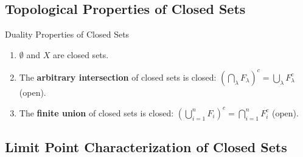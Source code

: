 \documentclass[11pt,a4paper]{article}
\begin{document}
\subsection{Topological Properties of Closed Sets}

\begin{formulabox}{Duality Properties of Closed Sets}
\begin{enumerate}
    \item $\emptyset$ and $X$ are closed sets.
    \item The \textbf{arbitrary intersection} of closed sets is closed: $\left(\bigcap_{\lambda} F_\lambda\right)^c = \bigcup_{\lambda} F_\lambda^c$ (open).
    \item The \textbf{finite union} of closed sets is closed: $\left(\bigcup_{i=1}^n F_i\right)^c = \bigcap_{i=1}^n F_i^c$ (open).
\end{enumerate}
\end{formulabox}

\subsection{Limit Point Characterization of Closed Sets}
\end{document}
